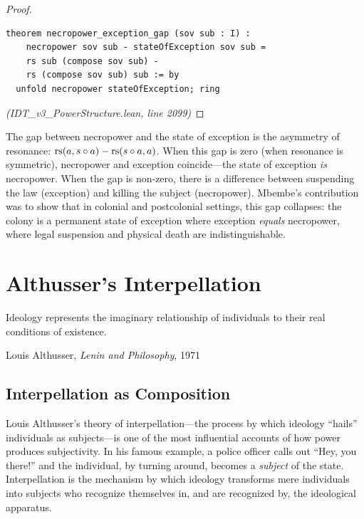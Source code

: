 \begin{proof}
\begin{lstlisting}
theorem necropower_exception_gap (sov sub : I) :
    necropower sov sub - stateOfException sov sub =
    rs sub (compose sov sub) -
    rs (compose sov sub) sub := by
  unfold necropower stateOfException; ring
\end{lstlisting}
\textit{(IDT\_v3\_PowerStructure.lean, line 2099)}
\end{proof}

\begin{interpretation}
The gap between necropower and the state of exception is the asymmetry of
resonance: $\mathrm{rs}(a, s \circ a) - \mathrm{rs}(s \circ a, a)$. When this gap is zero
(when resonance is symmetric), necropower and exception coincide---the state of
exception \emph{is} necropower. When the gap is non-zero, there is a difference
between suspending the law (exception) and killing the subject (necropower).
Mbembe's contribution was to show that in colonial and postcolonial settings,
this gap collapses: the colony is a permanent state of exception where exception
\emph{equals} necropower, where legal suspension and physical death are
indistinguishable.
\end{interpretation}


\chapter{Althusser's Interpellation}
\label{ch:althusser}

\epigraph{Ideology represents the imaginary relationship of individuals to their real conditions of existence.}{Louis Althusser, \textit{Lenin and Philosophy}, 1971}

\section{Interpellation as Composition}

Louis Althusser's theory of interpellation---the process by which ideology
``hails'' individuals as subjects---is one of the most influential accounts of
how power produces subjectivity. In his famous example, a police officer calls
out ``Hey, you there!'' and the individual, by turning around, becomes a
\emph{subject} of the state. Interpellation is the mechanism by which ideology
transforms mere individuals into subjects who recognize themselves in, and are
recognized by, the ideological apparatus.

